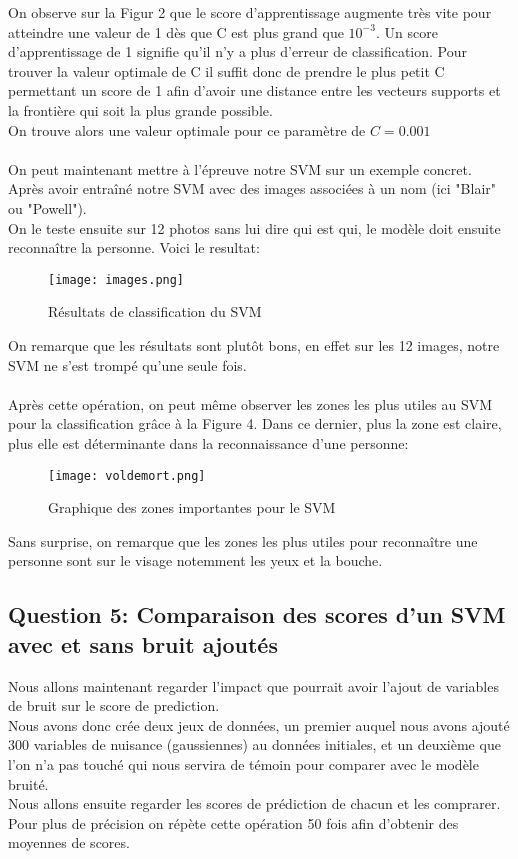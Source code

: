 \documentclass{article}
\begin{document}
On observe sur la Figur 2 que le score d'apprentissage augmente très vite pour atteindre une valeur de 1 dès que C est plus grand que $10^{-3}$. Un score d'apprentissage de 1 signifie qu'il n'y a plus d'erreur de classification. Pour trouver la valeur optimale de C il suffit donc de prendre le plus petit C permettant un score de 1 afin d'avoir une distance entre les vecteurs supports et la frontière qui soit la plus grande possible.
\\ On trouve alors une valeur optimale pour ce paramètre de $C = 0.001$
\\
\\
On peut maintenant mettre à l'épreuve notre SVM sur un exemple concret.
\\ Après avoir entraîné notre SVM avec des images associées à un nom (ici "Blair" ou "Powell").
\\On le teste ensuite sur 12 photos sans lui dire qui est qui, le modèle doit ensuite reconnaître la personne. Voici le resultat:

\begin{figure}[h]
    \centering
    \texttt{[image: images.png]}
    \caption{Résultats de classification du SVM}
    \label{fig:enter-label}
\end{figure}

On remarque que les résultats sont plutôt bons, en effet sur les 12 images, notre SVM ne s'est trompé qu'une seule fois.
\\
\\ Après cette opération, on peut même observer les zones les plus utiles au SVM pour la classification grâce à la Figure 4. Dans ce dernier, plus la zone est claire, plus elle est déterminante dans la reconnaissance d'une personne:

\begin{figure}
    \centering
    \texttt{[image: voldemort.png]}
    \caption{Graphique des zones importantes pour le SVM}
    \label{fig:enter-label}
\end{figure}

Sans surprise, on remarque que les zones les plus utiles pour reconnaître une personne sont sur le visage notemment les yeux et la bouche.


\subsection{Question 5: Comparaison des scores d'un SVM avec et sans bruit ajoutés}

Nous allons maintenant regarder l'impact que pourrait avoir l'ajout de variables de bruit sur le score de prediction.
\\Nous avons donc crée deux jeux de données, un premier auquel nous avons ajouté $300$ variables de nuisance (gaussiennes) au données initiales, et un deuxième que l'on n'a pas touché qui nous servira de témoin pour comparer avec le modèle bruité. 
\\ Nous allons ensuite regarder les scores de prédiction de chacun et les comprarer.
\\Pour plus de précision on répète cette opération 50 fois afin d'obtenir des moyennes de scores.
\end{document}
